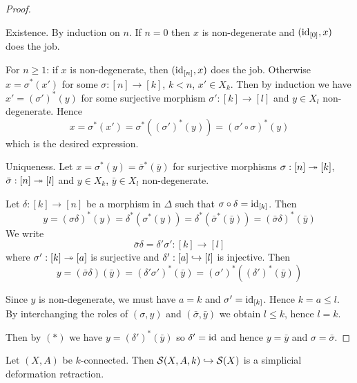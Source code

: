 \begin{proof}\ 

Existence. By induction on $n$. If $n=0$ then $x$ is non-degenerate and $(\id_{[0]},x)$ does the job.

For $n\geq1$: if $x$ is non-degenerate, then $(\id_{[n]},x)$ does the job.
Otherwise $x=\sigma^*(x')$ for some $\sigma:[n]\to [k]$, $k<n$, $x'\in X_k$.
Then by induction we have $x'=(\sigma')^*(y)$ for some surjective morphism $\sigma':[k]\to[l]$ and $y\in X_l$ non-degenerate. Hence \[x=\sigma^*(x')=\sigma^*((\sigma')^*(y))=(\sigma'\circ\sigma)^*(y)\] which is the desired expression.

Uniqueness. Let $x=\sigma^*(y)=\bar{\sigma}^*(\bar y)$ for surjective morphisms $\sigma:[n]\onto[k]$, $\bar{\sigma}:[n]\onto[l]$ and $y\in X_k$, $\bar y \in X_l$ non-degenerate.

Let $\delta:[k]\to[n]$ be a morphism in $\Delta$ such that $\sigma\circ\delta=\id_{[k]}$.
Then
\[y=(\sigma\delta)^*(y)=\delta^*(\sigma^*(y))=\delta^*(\bar{\sigma}^*(\bar{y}))=(\bar{\sigma}\delta)^*(\bar{y})\]
We write
\[\bar{\sigma}\delta=\delta'\sigma': [k]\to[l]\]
where $\sigma':[k]\onto[a]$ is surjective and $\delta':[a]\hto[l]$ is injective. Then \[y=(\bar\sigma\delta)(\bar y)=(\delta'\sigma')^*(\bar y)=(\sigma')^*((\delta')^*(\bar{y}))\tag{$*$}\]

Since $y$ is non-degenerate, we must have $a=k$ and $\sigma'=\id_{[k]}$. Hence $k=a\leq l$. By interchanging the roles of $(\sigma,y)$ and $(\bar{\sigma},\bar{y})$ we obtain $l\leq k$, hence $l=k$.

Then by $(*)$ we have $y=(\delta')^*(\bar{y})$ so $\delta'=\id$ and hence $y=\bar{y}$ and $\sigma=\bar{\sigma}$.
\end{proof}

\begin{theorem}\label{theorem:simplicial-deformation-retraction}
Let $(X,A)$ be $k$-connected. Then $\S(X,A,k)\hookrightarrow \S(X)$ is a simplicial deformation retraction.
\end{theorem}

